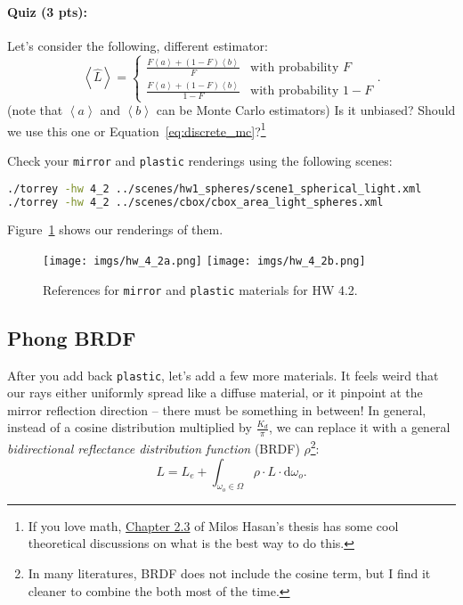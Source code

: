 \paragraph{Quiz (3 pts):} Let's consider the following, different estimator:
\begin{equation}
\left<\hat{L}\right> = \begin{cases}
\frac{F \left<a\right> + (1 - F)\left<b\right>}{F} & \text{with probability } F \\
\frac{F \left<a\right> + (1 - F)\left<b\right>}{1 - F} & \text{with probability } 1 - F
\end{cases}.
\end{equation}
(note that $\left<a\right>$ and $\left<b\right>$ can be Monte Carlo estimators) Is it unbiased? Should we use this one or Equation~\eqref{eq:discrete_mc}?\footnote{If you love math, \href{https://ecommons.cornell.edu/handle/1813/13985}{Chapter 2.3} of Milos Hasan's thesis has some cool theoretical discussions on what is the best way to do this.}

Check your \lstinline{mirror} and \lstinline{plastic} renderings using the following scenes:
\begin{lstlisting}[language=bash]
./torrey -hw 4_2 ../scenes/hw1_spheres/scene1_spherical_light.xml
./torrey -hw 4_2 ../scenes/cbox/cbox_area_light_spheres.xml
\end{lstlisting}
Figure~\ref{fig:hw_4_2_mirror_plastic} shows our renderings of them.

\begin{figure}[ht]
    \centering
    \texttt{[image: imgs/hw\_4\_2a.png]}
    \texttt{[image: imgs/hw\_4\_2b.png]}
    \caption{References for \lstinline{mirror} and \lstinline{plastic} materials for HW 4.2.}
    \label{fig:hw_4_2_mirror_plastic}
\end{figure}

\subsection{Phong BRDF}
After you add back \lstinline{plastic}, let's add a few more materials. It feels weird that our rays either uniformly spread like a diffuse material, or it pinpoint at the mirror reflection direction -- there must be something in between! In general, instead of a cosine distribution multiplied by $\frac{K_d}{\pi}$, we can replace it with a general \emph{bidirectional reflectance distribution function} (BRDF) $\rho$\footnote{In many literatures, BRDF does not include the cosine term, but I find it cleaner to combine the both most of the time.}:
\begin{equation}
L = L_e + \int_{\omega_o \in \Omega} \rho \cdot L \cdot \mathrm{d}\omega_o.
\label{eq:rendering_equation}
\end{equation}

